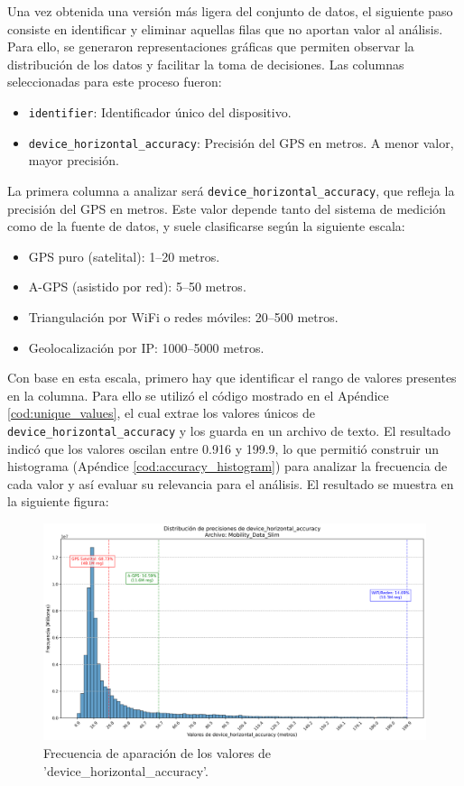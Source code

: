 Una vez obtenida una versión más ligera del conjunto de datos, el siguiente paso consiste en identificar y eliminar aquellas filas que no aportan valor al análisis. Para ello, se generaron representaciones gráficas que permiten observar la distribución de los datos y facilitar la toma de decisiones. Las columnas seleccionadas para este proceso fueron:

\begin{itemize}
    \item \texttt{identifier}: Identificador único del dispositivo.
    \item \texttt{device\_horizontal\_accuracy}: Precisión del GPS en metros. A menor valor, mayor precisión.
\end{itemize}

La primera columna a analizar será \texttt{device\_horizontal\_accuracy}, que refleja la precisión del GPS en metros. Este valor depende tanto del sistema de medición como de la fuente de datos, y suele clasificarse según la siguiente escala:

\begin{itemize}
    \item GPS puro (satelital): 1–20 metros.
    \item A-GPS (asistido por red): 5–50 metros.
    \item Triangulación por WiFi o redes móviles: 20–500 metros.
    \item Geolocalización por IP: 1000–5000 metros.
\end{itemize}

Con base en esta escala,  primero hay que identificar el rango de valores presentes en la columna. Para ello se utilizó el código mostrado en el Apéndice \ref{cod:unique_values}, el cual extrae los valores únicos de \texttt{device\_horizontal\_accuracy} y los guarda en un archivo de texto. El resultado indicó que los valores oscilan entre 0.916 y 199.9, lo que permitió construir un histograma (Apéndice \ref{cod:accuracy_histogram}) para analizar la frecuencia de cada valor y así evaluar su relevancia para el análisis. El resultado se muestra en la siguiente figura:

\begin{figure}[H]
    \centering
    \includegraphics[width=\textwidth]{img/histograma_device_horizontal_accuracy_Mobility_Data_Slim.png}
    \caption{Frecuencia de aparación de los valores de 'device\_horizontal\_accuracy'.}
    \label{fig:accuracy_histogram}
\end{figure}

